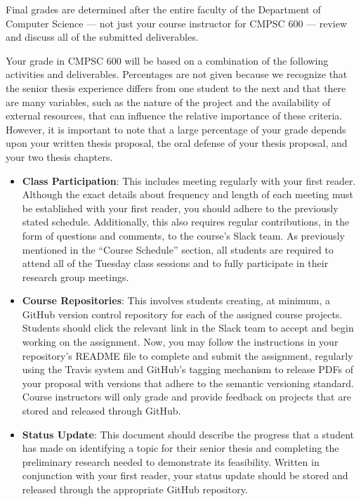 \documentclass[11pt]{article}
\begin{document}
Final grades are determined after the entire faculty of the Department of
Computer Science --- not just your course instructor for CMPSC 600 --- review
and discuss all of the submitted deliverables.

Your grade in CMPSC 600 will be based on a combination of the following
activities and deliverables. Percentages are not given because we recognize that
the senior thesis experience differs from one student to the next and that there
are many variables, such as the nature of the project and the availability of
external resources, that can influence the relative importance of these
criteria. However, it is important to note that a large percentage of your grade
depends upon your written thesis proposal, the oral defense of your thesis
proposal, and your two thesis chapters.

\begin{itemize}
  \itemsep -.25em

  \item {\bf Class Participation}: This includes meeting regularly with your
    first reader. Although the exact details about frequency and length of each
    meeting must be established with your first reader, you should adhere to the
    previously stated schedule. Additionally, this also requires regular
    contributions, in the form of questions and comments, to the course's Slack
    team. As previously mentioned in the ``Course Schedule'' section, all
    students are required to attend all of the Tuesday class sessions and to
    fully participate in their research group meetings.

  \item {\bf Course Repositories}: This involves students creating, at minimum,
    a GitHub version control repository for each of the assigned course
    projects. Students should click the relevant link in the Slack team to
    accept and begin working on the assignment. Now, you may follow the
    instructions in your repository's README file to complete and submit the
    assignment, regularly using the Travis system and GitHub's tagging mechanism
    to release PDFs of your proposal with versions that adhere to the semantic
    versioning standard. Course instructors will only grade and provide feedback
    on projects that are stored and released through GitHub.

  \item {\bf Status Update}: This document should describe the progress that a
    student has made on identifying a topic for their senior thesis and
    completing the preliminary research needed to demonstrate its feasibility.
    Written in conjunction with your first reader, your status update should be
    stored and released through the appropriate GitHub repository.


\end{itemize}
\end{document}
